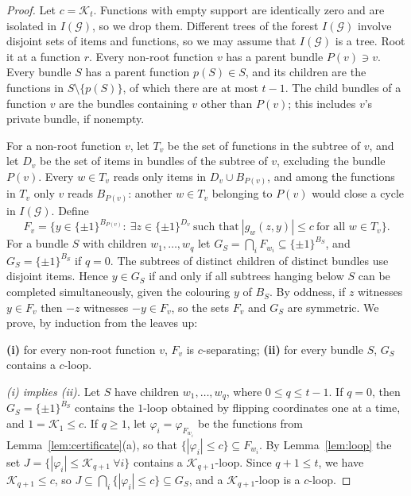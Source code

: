 \documentclass[11pt,letterpaper]{article}
\theoremstyle{definition}
\newcommand{\cG}{\mathcal{G}}
\newcommand{\cube}[1]{\{\pm1\}^{#1}}
\begin{document}
\begin{proof}
Let $c=\mathcal{K}_t$. Functions with empty support are identically zero and are isolated in $I(\cG)$, so
we drop them. Different trees of the forest $I(\cG)$ involve disjoint sets of items and functions,
so we may assume that $I(\cG)$ is a tree. Root it at a function $r$. Every non-root function $v$
has a parent bundle $P(v)\ni v$. Every bundle $S$ has a parent function $p(S)\in S$, and its
children are the functions in $S\setminus\{p(S)\}$, of which there are at most $t-1$. The child
bundles of a function $v$ are the bundles containing $v$ other than $P(v)$; this includes $v$'s
private bundle, if nonempty.

For a non-root function $v$, let $T_v$ be the set of functions in the subtree of $v$, and let
$D_v$ be the set of items in bundles of the subtree of $v$, excluding the bundle $P(v)$. Every
$w\in T_v$ reads only items in $D_v\cup B_{P(v)}$, and among the functions in $T_v$ only $v$
reads $B_{P(v)}$: another $w\in T_v$ belonging to $P(v)$ would close a cycle in $I(\cG)$. Define
\[
  F_v=\bigl\{y\in\cube{B_{P(v)}}:\ \exists z\in\cube{D_v}\ \text{such that}\ |g_w(z,y)|\le c\ \text{for all } w\in T_v\bigr\}.
\]
For a bundle $S$ with children $w_1,\dots,w_q$ let $G_S=\bigcap_iF_{w_i}\subseteq\cube{B_S}$, and
$G_S=\cube{B_S}$ if $q=0$. The subtrees of distinct children of distinct bundles use disjoint
items. Hence $y\in G_S$ if and only if all subtrees hanging below $S$ can be completed
simultaneously, given the colouring $y$ of $B_S$. By oddness, if $z$ witnesses $y\in F_v$ then
$-z$ witnesses $-y\in F_v$, so the sets $F_v$ and $G_S$ are symmetric. We prove, by induction from
the leaves up:

\smallskip\noindent\textbf{(i)} for every non-root function $v$, $F_v$ is $c$-separating;
\textbf{(ii)} for every bundle $S$, $G_S$ contains a $c$-loop.

\smallskip\noindent\emph{(i) implies (ii).}
Let $S$ have children $w_1,\dots,w_q$, where $0\le q\le t-1$. If $q=0$, then $G_S=\cube{B_S}$
contains the $1$-loop obtained by flipping coordinates one at a time, and $1=\mathcal{K}_1\le c$. If $q\ge1$,
let $\varphi_i=\varphi_{F_{w_i}}$ be the functions from Lemma~\ref{lem:certificate}(a), so that
$\{|\varphi_i|\le c\}\subseteq F_{w_i}$. By Lemma~\ref{lem:loop} the set
$J=\{|\varphi_i|\le \mathcal{K}_{q+1}\ \forall i\}$ contains a $\mathcal{K}_{q+1}$-loop. Since $q+1\le t$, we have
$\mathcal{K}_{q+1}\le c$, so $J\subseteq\bigcap_i\{|\varphi_i|\le c\}\subseteq G_S$, and a $\mathcal{K}_{q+1}$-loop is a
$c$-loop.


\end{proof}
\end{document}
